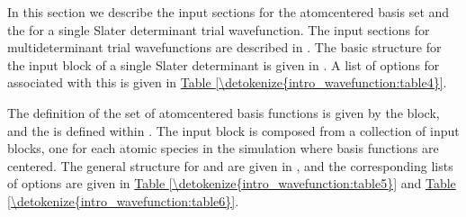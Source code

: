\documentclass[letterpaper,10pt,english]{sphinxmanual}
\begin{document}
In this section we describe the input sections for the atom\sphinxhyphen{}centered basis set and the  for a single Slater determinant trial wavefunction. The input sections for multideterminant trial wavefunctions are described in {\hyperref[\detokenize{intro_wavefunction:multideterminants}]{}}. The basic structure for the input block of a single Slater determinant is given in {\hyperref[\detokenize{intro_wavefunction:listing-3}]{}}.
A list of options for  associated with this  is given in \hyperref[\detokenize{intro_wavefunction:table4}]{Table \ref{\detokenize{intro_wavefunction:table4}}}.
\def\sphinxLiteralBlockLabel{\label{\detokenize{intro_wavefunction:listing-3}}}
\begin{sphinxVerbatim}[commandchars=\\\{\}]
   
\end{sphinxVerbatim}

The definition of the set of atom\sphinxhyphen{}centered basis functions is given by the  block, and the  is defined within . The  input block is composed from a collection of  input blocks, one for each atomic species in the simulation where basis functions are centered. The general structure for  and  are given in {\hyperref[\detokenize{intro_wavefunction:listing-4}]{}}, and the corresponding lists of options are given in
\hyperref[\detokenize{intro_wavefunction:table5}]{Table \ref{\detokenize{intro_wavefunction:table5}}} and \hyperref[\detokenize{intro_wavefunction:table6}]{Table \ref{\detokenize{intro_wavefunction:table6}}}.
\end{document}

